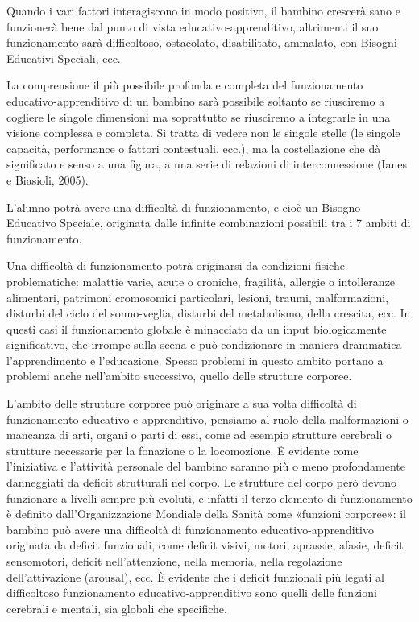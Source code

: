 Quando i vari fattori interagiscono in modo positivo, il bambino crescerà sano e funzionerà
bene dal punto di vista educativo-apprenditivo, altrimenti il suo funzionamento sarà difficoltoso,
ostacolato, disabilitato, ammalato, con Bisogni Educativi Speciali, ecc.

La comprensione il più possibile profonda e completa del funzionamento educativo-apprenditivo di
un bambino sarà possibile soltanto se riusciremo a cogliere le singole dimensioni ma soprattutto se
riusciremo a integrarle in una visione complessa e completa. Si tratta di vedere non le singole stelle
(le singole capacità, performance o fattori contestuali, ecc.), ma la costellazione che dà significato e
senso a una figura, a una serie di relazioni di interconnessione (Ianes e Biasioli, 2005).

L'alunno potrà avere una difficoltà di funzionamento, e cioè un Bisogno Educativo Speciale,
originata dalle infinite combinazioni possibili tra i 7 ambiti di funzionamento.

Una difficoltà di funzionamento potrà originarsi da condizioni fisiche problematiche: malattie
varie, acute o croniche, fragilità, allergie o intolleranze alimentari, patrimoni cromosomici
particolari, lesioni, traumi, malformazioni, disturbi del ciclo del sonno-veglia, disturbi del
metabolismo, della crescita, ecc. In questi casi il funzionamento globale è minacciato da un input
biologicamente significativo, che irrompe sulla scena e può condizionare in maniera drammatica
l'apprendimento e l'educazione. Spesso problemi in questo ambito portano a problemi anche
nell'ambito successivo, quello delle strutture corporee.

L'ambito delle strutture corporee può originare a sua volta difficoltà di funzionamento
educativo e apprenditivo, pensiamo al ruolo della malformazioni o mancanza di arti, organi o parti
di essi, come ad esempio strutture cerebrali o strutture necessarie per la fonazione o la
locomozione. È evidente come l'iniziativa e l'attività personale del bambino saranno più o meno
profondamente danneggiati da deficit strutturali nel corpo. Le strutture del corpo però devono
funzionare a livelli sempre più evoluti, e infatti il terzo elemento di funzionamento è definito
dall'Organizzazione Mondiale della Sanità come «funzioni corporee»: il bambino può avere una
difficoltà di funzionamento educativo-apprenditivo originata da deficit funzionali, come deficit
visivi, motori, aprassie, afasie, deficit sensomotori, deficit nell'attenzione, nella memoria, nella
regolazione dell'attivazione (arousal), ecc. È evidente che i deficit funzionali più legati al difficoltoso
funzionamento educativo-apprenditivo sono quelli delle funzioni cerebrali e mentali, sia globali
che specifiche.

